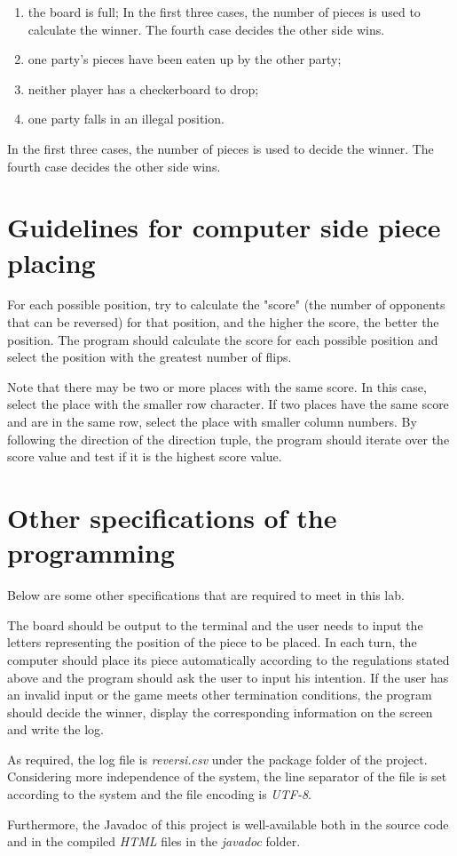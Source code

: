\documentclass[a4paper]{report}
\begin{document}
\begin{enumerate}
\item the board is full; In the first three cases, the number of pieces is used to calculate the winner. The fourth case decides the other side wins.
\item one party's pieces have been eaten up by the other party; 
\item neither player has a checkerboard to drop;
\item one party falls in an illegal position.
\end{enumerate}
In the first three cases, the number of pieces is used to decide the winner. The fourth case decides the other side wins.
\section{Guidelines for computer side piece placing}
For each possible position, try to calculate the "score" (the number of opponents that can be reversed) for that position, and the higher the score, the better the position. The program should calculate the score for each possible position and select the position with the greatest number of flips. 
\par
Note that there may be two or more places with the same score. In this case, select the place with the smaller row character. If two places have the same score and are in the same row, select the place with smaller column numbers. By following the direction of the direction tuple, the program should iterate over the score value and test if it is the highest score value.

\section{Other specifications of the programming}
Below are some other specifications that are required to meet in this lab.
\par
The board should be output to the terminal and the user needs to input the letters representing the position of the piece to be placed. In each turn, the computer should place its piece automatically according to the regulations stated above and the program should ask the user to input his intention. If the user has an invalid input or the game meets other termination conditions, the program should decide the winner, display the corresponding information on the screen and write the log.
\par
As required, the log file is \emph{reversi.csv} under the package folder of the project. Considering more independence of the system, the line separator of the file is set according to the system and the file encoding is \emph{UTF-8}.
\par
Furthermore, the Javadoc of this project is well-available both in the source code and in the compiled \emph{HTML} files in the \emph{javadoc} folder.
\end{document}

